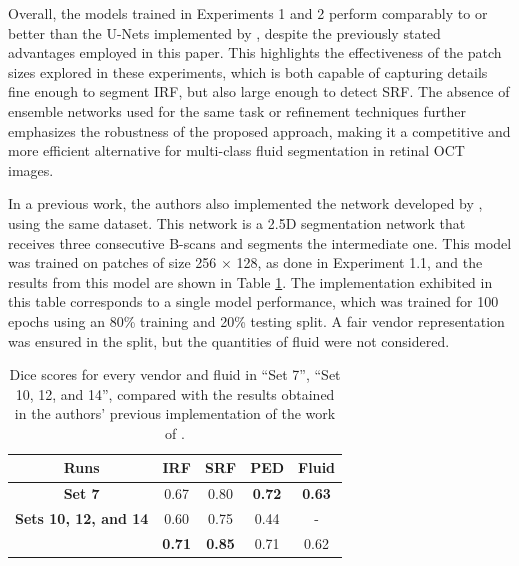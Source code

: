 \par
Overall, the models trained in Experiments 1 and 2 perform comparably to or better than the U-Nets implemented by \textcite{Alsaih2020}, despite the previously stated advantages employed in this paper. This highlights the effectiveness of the patch sizes explored in these experiments, which is both capable of capturing details fine enough to segment IRF, but also large enough to detect SRF. The absence of ensemble networks used for the same task or refinement techniques further emphasizes the robustness of the proposed approach, making it a competitive and more efficient alternative for multi-class fluid segmentation in retinal OCT images.
\par
In a previous work, the authors also implemented the network developed by \textcite{Tennakoon2018}, using the same dataset. This network is a 2.5D segmentation network that receives three consecutive B-scans and segments the intermediate one. This model was trained on patches of size 256 $\times$ 128, as done in Experiment 1.1, and the results from this model are shown in Table \ref{tab:Experiment1VsExperiment2VsTennakoon}. The implementation exhibited in this table corresponds to a single model performance, which was trained for 100 epochs using an 80\% training and 20\% testing split. A fair vendor representation was ensured in the split, but the quantities of fluid were not considered.

\begin{table}[!ht]
	\caption{Dice scores for every vendor and fluid in ``Set 7'', ``Set 10, 12, and 14'', compared with the results obtained in the authors' previous implementation of the work of \textcite{Tennakoon2018}.}
	\centering
	\begin{tabular}{|c|c|c|c|c|}
		\hline
		\textbf{Runs} & \textbf{IRF} & 
		\textbf{SRF} & 
		\textbf{PED} &
		\textbf{Fluid} \\
		
		\hline
		
		\textbf{Set 7} & 0.67 & 0.80 & \textbf{0.72} & \textbf{0.63} \\
		
		\hline
		
		\textbf{Sets 10, 12, and 14} & 0.60 & 0.75 & 0.44 & - \\
		
		\hline
		\hline
		
		\textbf{\textcite{Tennakoon2018}} & \textbf{0.71} & \textbf{0.85} & 0.71 & 0.62 \\
		
		\hline
		
	\end{tabular}
	\label{tab:Experiment1VsExperiment2VsTennakoon}
\end{table}


